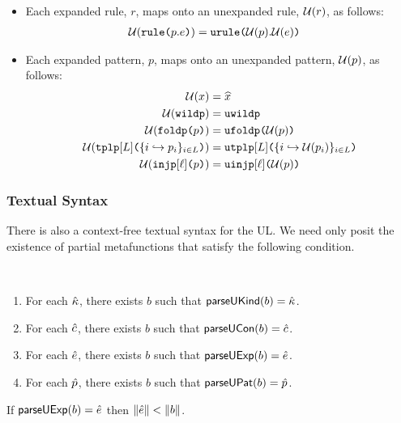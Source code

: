 \begin{itemize}
\item Each expanded rule, $r$, maps onto an unexpanded rule, $\mathcal{U}(r)$, as follows:
\begin{align*}
\mathcal{U}(\texttt{rule}\texttt{(}p.e\texttt{)}) & = \texttt{urule}\texttt{(}\mathcal{U}(p).\mathcal{U}(e)\texttt{)}
\end{align*}
\item Each expanded pattern, $p$, maps onto an unexpanded pattern, $\mathcal{U}(p)$, as follows:
\begin{align*}
\mathcal{U}(x) & = \widehat{x}\\
\mathcal{U}(\texttt{wildp}) &= \texttt{uwildp}\\
\mathcal{U}(\texttt{foldp}\texttt{(}p\texttt{)}) &= \texttt{ufoldp}\texttt{(}\mathcal{U}(p)\texttt{)}\\
\mathcal{U}(\texttt{tplp}[L]\texttt{(}\{i \hookrightarrow p_{i}\}_{i \in L}\texttt{)}) & = \texttt{utplp}[L]\texttt{(}\{i \hookrightarrow \mathcal{U}(p_{i})\}_{i \in L}\texttt{)}\\
\mathcal{U}(\texttt{injp}[\ell]\texttt{(}p\texttt{)}) & = \texttt{uinjp}[\ell]\texttt{(}\mathcal{U}(p)\texttt{)}
\end{align*}
\end{itemize}

\subsubsection{Textual Syntax}
There is also a context-free textual syntax for the UL. We need only posit the existence of partial metafunctions that satisfy the following condition. 
\begin{condition}\label{condition:textual-representability-P} ~
\begin{enumerate}
\item For each ${\hat\kappa}$, there exists $b$ such that $\mathsf{parseUKind}(b)={\hat\kappa}$.
\item For each ${\hat c}$, there exists $b$ such that $\mathsf{parseUCon}(b)={\hat c}$.
\item For each ${\hat e}$, there exists $b$ such that $\mathsf{parseUExp}(b)={\hat e}$.
\item For each $\hat{p}$, there exists $b$ such that $\mathsf{parseUPat}(b)=\hat{p}$.
\end{enumerate}
\end{condition}

\begin{condition}\label{condition:body-parsing-P} If $\mathsf{parseUExp}(b)={\hat e}$ then $\Vert {\hat e} \Vert < \Vert b \Vert$.\end{condition}

